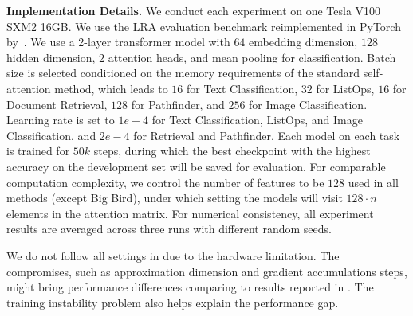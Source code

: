 

















\textbf{Implementation Details.}
We conduct each experiment on one Tesla V100 SXM2 16GB.
We use the LRA evaluation benchmark reimplemented in PyTorch by~\citet{DBLP:journals/corr/abs-2102-03902}.
We use a 2-layer transformer model with $64$ embedding dimension, $128$ hidden dimension, $2$ attention heads, and mean pooling for classification. 
Batch size is selected conditioned on the memory requirements of the standard self-attention method, which leads to $16$ for Text Classification, $32$ for ListOps, $16$ for Document Retrieval, $128$ for Pathfinder, and $256$ for Image Classification.
Learning rate is set to $1e-4$ for Text Classification, ListOps, and Image Classification, and $2e-4$ for Retrieval and Pathfinder.
Each model on each task is trained for $50k$ steps, during which the best checkpoint with the highest accuracy on the development set will be saved for evaluation.
For comparable computation complexity, we control the number of features to be $128$ used in all methods (except Big Bird), under which setting the models will visit $128\cdot n$ elements in the attention matrix.
For numerical consistency, all experiment results are averaged across three runs with different random seeds.


We do not follow all settings in \citep{DBLP:journals/corr/abs-2102-03902} due to the hardware limitation.
The compromises, such as approximation dimension and gradient accumulations steps, might bring performance differences comparing to results reported in \citep{DBLP:journals/corr/abs-2102-03902}.
The training instability problem also helps explain the performance gap.



